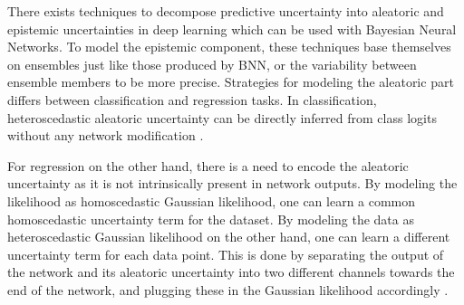 There exists techniques to decompose predictive uncertainty into aleatoric and epistemic uncertainties in deep learning which can be used with Bayesian Neural Networks. To model the epistemic component, these techniques base themselves on ensembles just like those produced by BNN, or the variability between ensemble members to be more precise. Strategies for modeling the aleatoric part differs between classification and regression tasks. In classification, heteroscedastic aleatoric uncertainty can be directly inferred from class logits without any network modification \cite{shridhar_comprehensive_2019, kwon_uncertainty_2020}.

For regression on the other hand, there is a need to encode the aleatoric uncertainty as it is not intrinsically present in network outputs. By modeling the likelihood as homoscedastic Gaussian likelihood, one can learn a common homoscedastic uncertainty term for the dataset. By modeling the data as heteroscedastic Gaussian likelihood on the other hand, one can learn a different uncertainty term for each data point. This is done by separating the output of the network and its aleatoric uncertainty into two different channels towards the end of the network, and plugging these in the Gaussian likelihood accordingly \cite{kendall_what_2017}.





